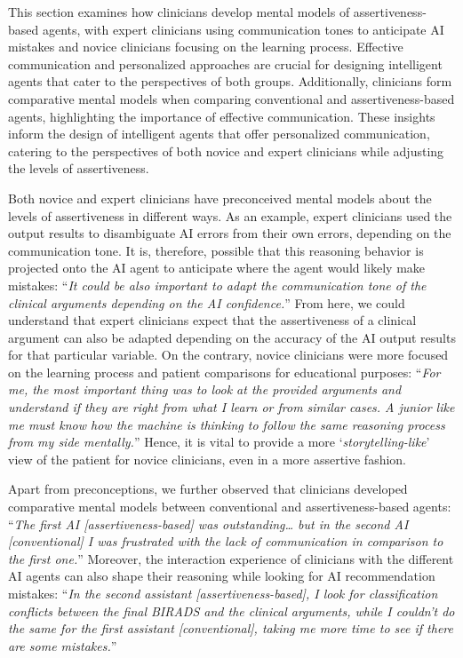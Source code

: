 This section examines how clinicians develop mental models of assertiveness-based agents, with expert clinicians using communication tones to anticipate \ac{AI} mistakes and novice clinicians focusing on the learning process.
Effective communication and personalized approaches are crucial for designing intelligent agents that cater to the perspectives of both groups.
Additionally, clinicians form comparative mental models when comparing conventional and assertiveness-based agents, highlighting the importance of effective communication.
These insights inform the design of intelligent agents that offer personalized communication, catering to the perspectives of both novice and expert clinicians while adjusting the levels of assertiveness.

Both novice and expert clinicians have preconceived mental models about the levels of assertiveness in different ways.
As an example, expert clinicians used the output results to disambiguate AI errors from their own errors, depending on the communication tone.
It is, therefore, possible that this reasoning behavior is projected onto the AI agent to anticipate where the agent would likely make mistakes: ``{\it It could be also important to adapt the communication tone of the clinical arguments depending on the AI confidence.}''
From here, we could understand that expert clinicians expect that the assertiveness of a clinical argument can also be adapted depending on the accuracy of the AI output results for that particular variable.
On the contrary, novice clinicians were more focused on the learning process and patient comparisons for educational purposes: ``{\it For me, the most important thing was to look at the provided arguments and understand if they are right from what I learn or from similar cases. A junior like me must know how the machine is thinking to follow the same reasoning process from my side mentally.}''
Hence, it is vital to provide a more `{\it storytelling-like}' view of the patient for novice clinicians, even in a more assertive fashion.

Apart from preconceptions, we further observed that clinicians developed comparative mental models between conventional and assertiveness-based agents: ``{\it The first AI [assertiveness-based] was outstanding… but in the second AI [conventional] I was frustrated with the lack of communication in comparison to the first one.}''
Moreover, the interaction experience of clinicians with the different AI agents can also shape their reasoning while looking for AI recommendation mistakes: ``{\it In the second assistant [assertiveness-based], I look for classification conflicts between the final BIRADS and the clinical arguments, while I couldn't do the same for the first assistant [conventional], taking me more time to see if there are some mistakes.}''

